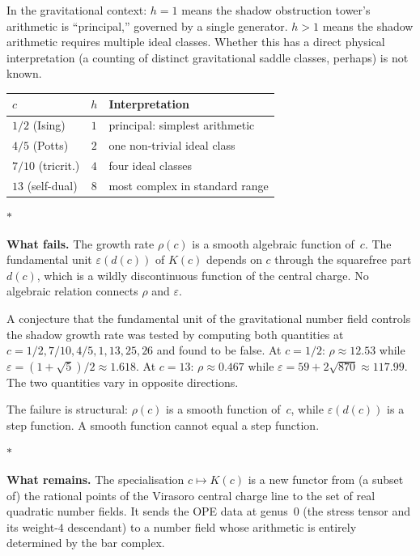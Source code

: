 \documentclass[11pt]{article}
\newcommand{\sep}{\bigskip\begin{center}$*$\end{center}\medskip}
\begin{document}
In the gravitational context: $h = 1$ means the shadow obstruction tower's
arithmetic is ``principal,'' governed by a single generator.
$h > 1$ means the shadow arithmetic requires multiple ideal
classes.  Whether this has a direct physical interpretation
(a counting of distinct gravitational saddle classes, perhaps)
is not known.

\begin{center}
\small
\renewcommand{\arraystretch}{1.15}
\begin{tabular}{@{}lcl@{}}
$c$ & $h$ & \textbf{Interpretation} \\
\hline
$1/2$ (Ising) & $1$ & principal: simplest arithmetic \\[2pt]
$4/5$ (Potts) & $2$ & one non-trivial ideal class \\[2pt]
$7/10$ (tricrit.) & $4$ & four ideal classes \\[2pt]
$13$ (self-dual) & $8$ & most complex in standard range
\end{tabular}
\end{center}

\sep

\noindent\textbf{What fails.}\enspace
The growth rate $\rho(c)$ is a smooth algebraic function
of~$c$.  The fundamental unit $\varepsilon(d(c))$ of $K(c)$
depends on $c$ through the squarefree part $d(c)$, which is a
wildly discontinuous function of the central charge.  No
algebraic relation connects $\rho$ and $\varepsilon$.

A conjecture that the fundamental unit of the gravitational
number field controls the shadow growth rate was tested by
computing both quantities at $c = 1/2, 7/10, 4/5, 1, 13, 25, 26$
and found to be false.  At $c = 1/2$: $\rho \approx 12.53$
while $\varepsilon = (1+\sqrt{5})/2 \approx 1.618$.  At
$c = 13$: $\rho \approx 0.467$ while
$\varepsilon = 59 + 2\sqrt{870} \approx 117.99$.  The two
quantities vary in opposite directions.

The failure is structural: $\rho(c)$ is a smooth function
of~$c$, while $\varepsilon(d(c))$ is a step function.
A smooth function cannot equal a step function.

\sep

\noindent\textbf{What remains.}\enspace
The specialisation $c \mapsto K(c)$ is a new functor from
(a subset of) the rational points of the Virasoro central
charge line to the set of real quadratic number fields.  It
sends the OPE data at genus~$0$ (the stress tensor and its
weight-$4$ descendant) to a number field whose arithmetic
is entirely determined by the bar complex.
\end{document}
